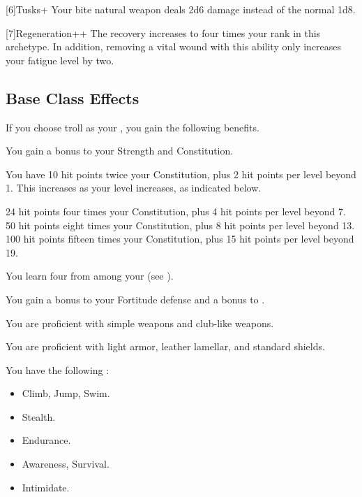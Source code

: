     [6]{Tusks+} Your bite natural weapon deals 2d6 damage instead of the normal 1d8.

    [7]{Regeneration++} The recovery increases to four times your rank in this archetype.
      In addition, removing a vital wound with this ability only increases your fatigue level by two.

  \subsection{Base Class Effects}
    If you choose troll as your , you gain the following benefits.

      You gain a  bonus to your Strength and Constitution.

      You have 10 hit points \add twice your Constitution, plus 2 hit points per level beyond 1.
      This increases as your level increases, as indicated below.
      \begin{itemize}
         24 hit points \add four times your Constitution, plus 4 hit points per level beyond 7.
         50 hit points \add eight times your Constitution, plus 8 hit points per level beyond 13.
         100 hit points \add fifteen times your Constitution, plus 15 hit points per level beyond 19.
      \end{itemize}

      You learn four  from among your  (see ).

      You gain a  bonus to your Fortitude defense and a  bonus to .

      You are proficient with simple weapons and club-like weapons.

      You are proficient with light armor, leather lamellar, and standard shields.

      You have the following :

      \begin{itemize}
        \item {} Climb, Jump, Swim.
        \item {} Stealth.
        \item {} Endurance.
        \item {} Awareness, Survival.
        \item {} Intimidate.
      \end{itemize}

